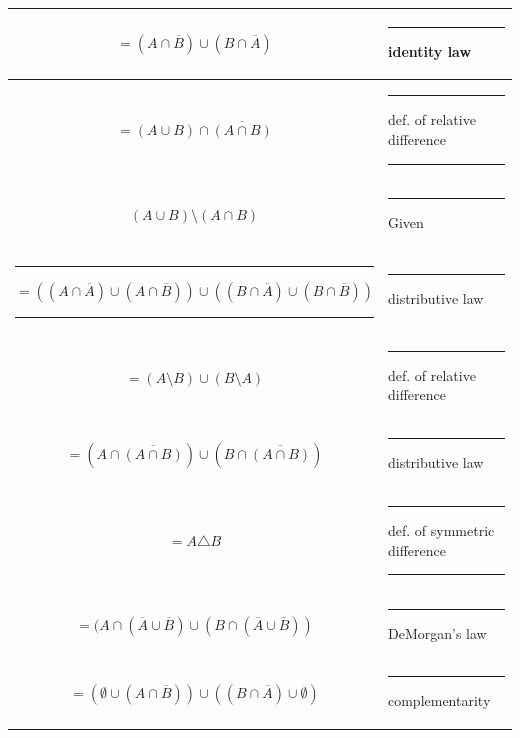 \documentclass{amsart}
\begin{document}
\begin{enumerate}
\vfill

\hspace{-1.1in}
\begin{tabular}{|c|l|}\hline
\rule[-18pt]{0pt}{48pt}$= (A \cap \overline{B}) \cup (B \cap \overline{A})$ & \rule{12pt}{0pt} identity law \\\hline
\rule[-18pt]{0pt}{48pt}$= (A \cup B) \cap \overline{(A \cap B)}$ & \rule{12pt}{0pt} def. of relative difference \rule{12pt}{0pt} \\\hline
\rule[-18pt]{0pt}{48pt}$(A \cup B) \setminus (A \cap B)$ & \rule{12pt}{0pt} Given  \\\hline
\rule[-18pt]{0pt}{48pt}\rule{12pt}{0pt}$= ((A \cap \overline{A}) \cup (A \cap \overline{B})) \cup ((B \cap \overline{A}) \cup (B \cap \overline{B}))$ \rule{12pt}{0pt} & \rule{12pt}{0pt} distributive law  \\\hline
\rule[-18pt]{0pt}{48pt}$= (A \setminus B) \cup (B \setminus A)$ & \rule{12pt}{0pt}  def. of relative difference \\\hline
\rule[-18pt]{0pt}{48pt}$= (A \cap \overline{(A \cap B)}) \cup (B \cap \overline{(A \cap B)})$ & \rule{12pt}{0pt} distributive law \\\hline
\rule[-18pt]{0pt}{48pt}$= A \triangle B $ & \rule{12pt}{0pt} def. of symmetric difference \rule{12pt}{0pt}\\\hline
\rule[-18pt]{0pt}{48pt}$= (A \cap (\overline{A} \cup \overline{B}) \cup (B \cap (\overline{A} \cup \overline{B}))$ & \rule{12pt}{0pt} DeMorgan's law \\\hline
\rule[-18pt]{0pt}{48pt}$= (\emptyset \cup (A \cap \overline{B})) \cup ((B \cap \overline{A}) \cup \emptyset)$ & \rule{12pt}{0pt} complementarity \\\hline
\end{tabular}


\end{enumerate}
\end{document}
